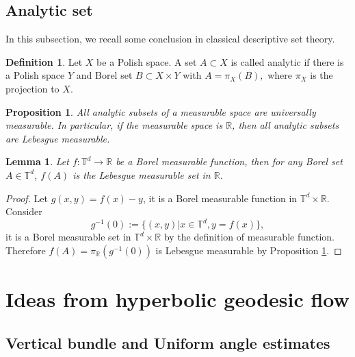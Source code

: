 \documentclass[11pt]{amsart}
\newtheorem{lemma}[theorem]{Lemma}
\newtheorem{proposition}[theorem]{Proposition}
\theoremstyle{remark}
\theoremstyle{definition}
\newtheorem{definition}{Definition}
\newcommand{\R}{{\mathbf R}}
\newcommand{\T}{{\mathbf T}}
\def\R{{\mathbb R}}
\def\T{{\mathbb T}}
\begin{document}
\subsection{Analytic set}
In this subsection, we recall some conclusion in classical descriptive set theory.
\begin{definition}\cite{Ke}
    Let $X$ be a Polish space. A set $A\subset X$ is called analytic if there is a Polish space $Y$ and Borel set $B\subset X\times Y$ with $A=\pi_X(B),$ where $\pi_X$ is the projection to $X.$
\end{definition}
\begin{proposition}\cite{Ke}\label{ana}
    All analytic subsets of a measurable space are universally measurable. In particular, if the measurable space is $\R$, then all analytic subsets are Lebesgue measurable.
\end{proposition}
\begin{lemma}\label{leb}
    Let $f:\T^d\rightarrow\R$ be a Borel measurable function, then for any Borel set $A\in\T^d$, $f(A)$ is the Lebesgue measurable set in $\R.$
\end{lemma}
\begin{proof}
    Let $g(x,y)=f(x)-y$, it is a Borel measurable function in $\T^d\times\R$. Consider $$g^{-1}(0):=\{(x,y)|x\in\T^d,y=f(x)\},$$
    it is a Borel measurable set in $\T^d\times\R$ by the definition of measurable function.
   Therefore $f(A)=\pi_\R(g^{-1}(0))$ is Lebesgue measurable by Proposition \ref{ana}.
\end{proof}






\section{Ideas from hyperbolic geodesic flow}\label{ideah}
\subsection{Vertical bundle and Uniform angle estimates}\label{ver-sch}
\end{document}

